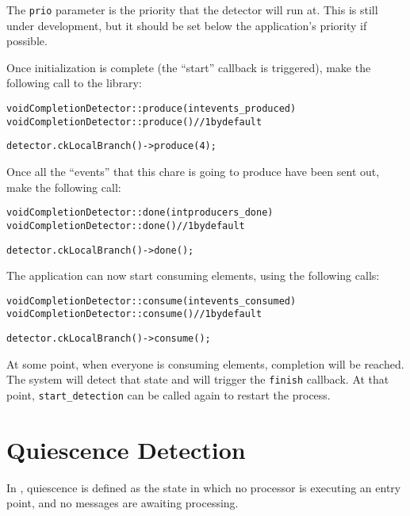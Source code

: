 The \verb|prio| parameter is the priority that the detector will run
at. This is still under development, but it should be set below the
application's priority if possible.

Once initialization is complete (the ``start'' callback is triggered),
make the following call to the library:

\begin{alltt}
void CompletionDetector::produce(int events_produced)
void CompletionDetector::produce() // 1 by default
\end{alltt}

\begin{alltt}
detector.ckLocalBranch()->produce(4);
\end{alltt}

Once all the ``events'' that this chare is going to produce have been sent out,
make the following call:

\begin{alltt}
void CompletionDetector::done(int producers_done)
void CompletionDetector::done() // 1 by default
\end{alltt}

\begin{alltt}
detector.ckLocalBranch()->done();
\end{alltt}

The application can now start consuming elements, using the following calls:

\begin{alltt}
void CompletionDetector::consume(int events_consumed)
void CompletionDetector::consume() // 1 by default
\end{alltt}

\begin{alltt}
detector.ckLocalBranch()->consume();
\end{alltt}

At some point, when everyone is consuming elements, completion will be
reached. The system will detect that state and will trigger the \verb|finish|
callback. At that point, \verb|start_detection| can be called again to restart
the process.

\section{Quiescence Detection}
\label{sec:qd}

In \charmpp, quiescence is defined as the state in which no
processor is executing an entry point, and no messages are awaiting processing.

